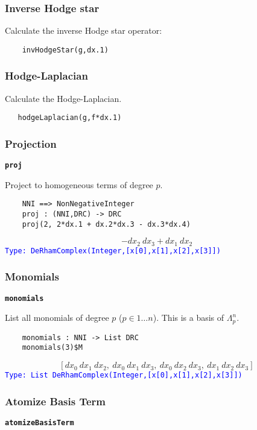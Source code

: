 \documentclass[12pt,a4paper]{article}
\newcommand{\spadbold}[1]{{\tt\bf #1}}
\newcommand{\type}[1]{\textcolor{blue}{\tt\tiny #1}}
\begin{document}
\subsubsection{Inverse Hodge star}
Calculate the inverse Hodge star operator:
\begin{lstlisting}
    invHodgeStar(g,dx.1)
\end{lstlisting}
%
\subsubsection{Hodge-Laplacian}
Calculate the Hodge-Laplacian.
\begin{lstlisting}
   hodgeLaplacian(g,f*dx.1)
\end{lstlisting}
%
\subsubsection{Projection}
\spadbold{proj}

Project to homogeneous terms of degree $p$.
  
\begin{lstlisting}
    NNI ==> NonNegativeInteger
    proj : (NNI,DRC) -> DRC    
    proj(2, 2*dx.1 + dx.2*dx.3 - dx.3*dx.4)
\end{lstlisting}
\begin{displaymath}
	 -{{dx _ {2}} \  {dx _ {3}}}+{{dx _ {1}} \  {dx _ {2}}}
\end{displaymath}
\type{Type: DeRhamComplex(Integer,[x[0],x[1],x[2],x[3]])}
%
\subsubsection{Monomials}
\spadbold{monomials}

List all monomials of degree $p$ ($p\in 1\ldots n$).
This is a basis of $\Lambda_p^n$.
\begin{lstlisting}
    monomials : NNI -> List DRC
    monomials(3)$M
\end{lstlisting}
\begin{displaymath}
  \left[
  {{dx _ {0}} \  {dx _ {1}} \  {dx _ {2}}}, \: {{dx _ {0}} \  {dx _
  {1}} \  {dx _ {3}}}, \: {{dx _ {0}} \  {dx _ {2}} \  {dx _ {3}}}, \:
  {{dx _ {1}} \  {dx _ {2}} \  {dx _ {3}}}
  \right]
\end{displaymath}
\type{Type: List DeRhamComplex(Integer,[x[0],x[1],x[2],x[3]])}
%
\subsubsection{Atomize Basis Term}
\spadbold{atomizeBasisTerm}
\end{document}
